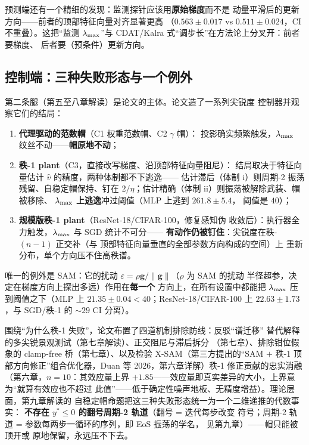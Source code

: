 预测端还有一个精细的发现：监测探针应该用\textbf{原始梯度}而不是
动量平滑后的更新方向——前者的顶部特征向量对齐显著更高
（$0.563\pm0.017$ vs $0.511\pm0.024$，CI 不重叠）。这把``监测
$\lambda_{\max}$''与 CDAT/Kalra 式``调步长''在方法论上分叉开：前者要梯度、
后者要（预条件）更新方向。

\subsection{控制端：三种失败形态与一个例外}\label{sec:ch01-control}

第二条腿（第五至八章解读）是论文的主体。论文造了一系列尖锐度
控制器并观察它们的结局：

\begin{enumerate}
  \item \textbf{代理驱动的范数帽}（C1 权重范数帽、C2 $\gamma$ 帽）：
        投影确实频繁触发，$\lambda_{\max}$ 纹丝不动——\textbf{帽原地不动}；
  \item \textbf{秩-1 plant}（C3，直接改写梯度、沿顶部特征向量阻尼）：
        结局取决于特征向量估计 $\hat v$ 的精度，两种体制都不下逃逸——
        估计滞后（体制 i）则周期-2 振荡残留、自稳定帽保持、钉在
        $2/\eta$；估计精确（体制 ii）则振荡被解除武装、帽被移除、
        $\lambda_{\max}$ \textbf{上逃逸}冲过阈值（MLP 上逃到 $261.8\pm5.4$，
        阈值是 $40$）；
  \item \textbf{规模版秩-1 plant}（ResNet-18/CIFAR-100，修复感知伪
        收敛后）：执行器全力触发，$\lambda_{\max}$ 与 SGD 统计不可分——
        \textbf{有动作仍被钉住}：尖锐度在秩-$(n{-}1)$ 正交补（与
        顶部特征向量垂直的全部参数方向构成的空间）上
        重新分布，单个方向压不住高秩谱。
\end{enumerate}

唯一的例外是 SAM：它的扰动
$\varepsilon=\rho\mathbf{g}/\|\mathbf{g}\|$（$\rho$ 为 SAM 的扰动
半径超参，决定在梯度方向上探出多远）作用在\textbf{每一个}
方向上，在所有设置中都能把 $\lambda_{\max}$ 压到阈值之下（MLP 上
$21.35\pm0.04 < 40$；ResNet-18/CIFAR-100 上 $22.63\pm1.73$，与
SGD/秩-1 的 $\sim 29$ CI 分离）。

围绕``为什么秩-1 失败''，论文布置了四道机制排除防线：反驳``谱迁移''
替代解释的多尖锐景观测试（第七章解读）、正交阻尼与滞后拆分
（第七章）、排除钳位假象的 clamp-free 桥（第七章）、以及检验
X-SAM（第三方提出的``SAM $+$ 秩-1 顶部方向修正''组合优化器，Duan
等 2026，第六章详解）秩-1 修正贡献的忠实消融（第六章，$n{=}10$：其效应量上界
$+1.85$——效应量即真实差异的大小，上界意为``就算有效应也不超过
此值''——低于确定性噪声地板、无精度增益）。理论层面，第九章解读的
自稳定帽命题把这三种失败形态统一为一个二维递推的代数事实：
\textbf{不存在 $y^{*}\le 0$ 的翻号周期-2 轨道}（翻号 = 迭代每步改变
符号；周期-2 轨道 = 参数每两步一循环的序列，即 EoS 振荡的学名，
见第九章）——帽只能被顶开或
原地保留，永远压不下去。

